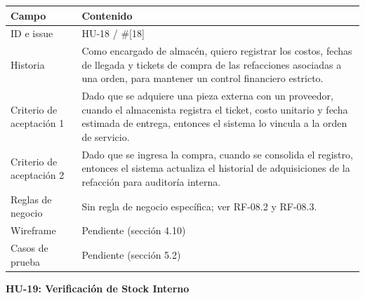 {\def\LTcaptype{none} %
\begin{longtable}[]{@{}
  >{\raggedright\arraybackslash}p{}
  >{\raggedright\arraybackslash}p{}@{}}
\toprule\noalign{}
\begin{minipage}[b]{\linewidth}\raggedright
\textbf{Campo}
\end{minipage} & \begin{minipage}[b]{\linewidth}\raggedright
\textbf{Contenido}
\end{minipage} \\
\midrule\noalign{}
\endhead
\bottomrule\noalign{}
\endlastfoot
ID e issue & HU-18 / \#{[}18{]} \\
Historia & Como encargado de almacén, quiero registrar los costos,
fechas de llegada y tickets de compra de las refacciones asociadas a una
orden, para mantener un control financiero estricto. \\
Criterio de aceptación 1 & Dado que se adquiere una pieza externa con un
proveedor, cuando el almacenista registra el ticket, costo unitario y
fecha estimada de entrega, entonces el sistema lo vincula a la orden de
servicio. \\
Criterio de aceptación 2 & Dado que se ingresa la compra, cuando se
consolida el registro, entonces el sistema actualiza el historial de
adquisiciones de la refacción para auditoría interna. \\
Reglas de negocio & Sin regla de negocio específica; ver RF-08.2 y
RF-08.3. \\
Wireframe & Pendiente (sección 4.10) \\
Casos de prueba & Pendiente (sección 5.2) \\
\end{longtable}
}

\textbf{HU-19: Verificación de Stock Interno}

